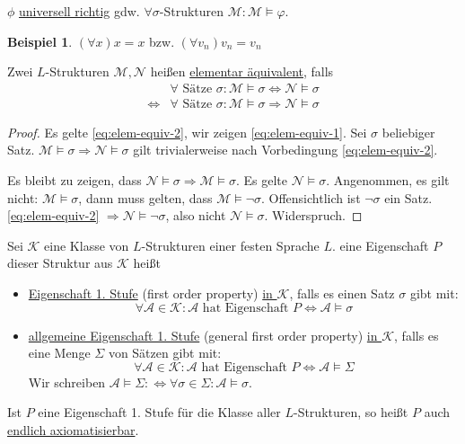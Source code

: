 \documentclass{article}
\theoremstyle{definition}
\newtheorem*{exm}{Beispiel}
\newcommand{\calA}{\mathcal{A}}
\newcommand{\calK}{\mathcal{K}}
\newcommand{\calM}{\mathcal{M}}
\newcommand{\calN}{\mathcal{N}}
\begin{document}
    $ \phi $ \underline{universell richtig} gdw. $ \forall \sigma$-Strukturen $ \calM: \calM \models \varphi $.
    \begin{exm}
        $ (\forall x) x = x $ bzw. $ (\forall v_n) v_n = v_n $
    \end{exm}

    Zwei $ L $-Strukturen $ \calM, \calN $ heißen \underline{elementar äquivalent}, falls
    \begin{align}
        & \forall \text{ Sätze } \sigma: \calM \models \sigma \Leftrightarrow \calN \models \sigma \label{eq:elem-equiv-1} \\
        \Leftrightarrow & \forall \text{ Sätze } \sigma: \calM \models \sigma \Rightarrow \calN \models \sigma \label{eq:elem-equiv-2}
    \end{align}

    \begin{proof}
        Es gelte \eqref{eq:elem-equiv-2}, wir zeigen \eqref{eq:elem-equiv-1}.
        Sei $ \sigma $ beliebiger Satz.
        $ \calM \models \sigma \Rightarrow \calN \models \sigma $
        gilt trivialerweise nach Vorbedingung \eqref{eq:elem-equiv-2}.

        Es bleibt zu zeigen, dass $ \calN \models \sigma \Rightarrow \calM \models \sigma $.
        Es gelte $ \calN \models \sigma $.
        Angenommen, es gilt nicht: $ \calM \models \sigma $, dann muss gelten, dass $ \calM \models \neg \sigma $.
        Offensichtlich ist $ \neg \sigma $ ein Satz.
        \eqref{eq:elem-equiv-2} $ \Rightarrow \calN \models \neg \sigma $, also nicht $ \calN \models \sigma $. Widerspruch.
    \end{proof}

    Sei $ \calK $ eine Klasse von $ L $-Strukturen einer festen Sprache $ L $.
    eine Eigenschaft $ P$ dieser Struktur aus $ \calK $ heißt
    \begin{itemize}
        \item \underline{Eigenschaft 1. Stufe} (first order property) \underline{in $ \calK $}, falls es einen Satz $ \sigma $ gibt mit:
        \begin{equation*}
            \forall \calA \in \calK : \calA \text{ hat Eigenschaft } P \Leftrightarrow \calA \models \sigma
        \end{equation*}
        \item \underline{allgemeine Eigenschaft 1. Stufe} (general first order property) \underline{in $ \calK $}, falls es eine Menge $ \Sigma $ von Sätzen gibt mit:
        \begin{equation*}
            \forall \calA \in \calK : \calA \text{ hat Eigenschaft } P \Leftrightarrow \calA \models \Sigma
        \end{equation*}
        Wir schreiben $ \calA \models \Sigma :\Leftrightarrow \forall \sigma \in \Sigma: \calA \models \sigma $.
    \end{itemize}
    Ist $ P $ eine Eigenschaft 1. Stufe für die Klasse aller $ L $-Strukturen, so heißt $ P $ auch \underline{endlich axiomatisierbar}.
\end{document}

